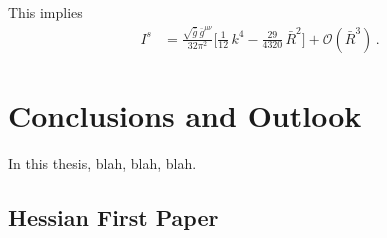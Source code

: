 \documentclass[11pt,draft]{book} %
\begin{document}
{This implies
\begin{align}
  I^s &= \frac{ \sqrt{\bar g} \, \bar g^{\mu\nu} }{ 32 \pi^2 }
  \bigg[
    \frac{1}{12} \, k^4  - \frac{29}{4320} \, \bar R^2
  \bigg]
  + \mathcal O (\bar R^3) \,.
\end{align}



\chapter*{Conclusions and Outlook}

In this thesis, blah, blah, blah.


\nocite{*}




\begin{appendices}
  \chapter{Hessian First Paper}


\end{appendices}}
\end{document}
